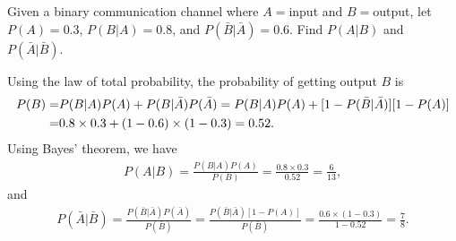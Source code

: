 \documentclass{assignment}
\begin{document}
\begin{prob}[10 pts]
    Given a binary communication channel where $A=$input and $B=$output, let $P(A)=0.3$, $P(B\vert A)=0.8$, and $P(\bar{B}\vert\bar{A})=0.6$. Find $P(A\vert B)$ and $P(\bar{A}\vert\bar{B})$.
\end{prob}
\begin{sol}
    Using the law of total probability, the probability of getting output $B$ is
    \begin{align}
        \notag P(B)=&P(B\vert A)P(A)+P(B\vert\bar{A})P(\bar{A})=P(B\vert A)P(A)+[1-P(\bar{B}\vert\bar{A})][1-P(A)]\\
        =&0.8\times 0.3+(1-0.6)\times(1-0.3)=0.52.
    \end{align}
    Using Bayes' theorem, we have
    \begin{align}
        P(A\vert B)=\frac{P(B\vert A)P(A)}{P(B)}=\frac{0.8\times 0.3}{0.52}=\frac{6}{13},
    \end{align}
    and
    \begin{align}
        P(\bar{A}\vert\bar{B})=\frac{P(\bar{B}\vert\bar{A})P(\bar{A})}{P(\bar{B})}=\frac{P(\bar{B}\vert\bar{A})[1-P(A)]}{P(\bar{B})}=\frac{0.6\times(1-0.3)}{1-0.52}=\frac{7}{8}.
    \end{align}
\end{sol}
\end{document}
